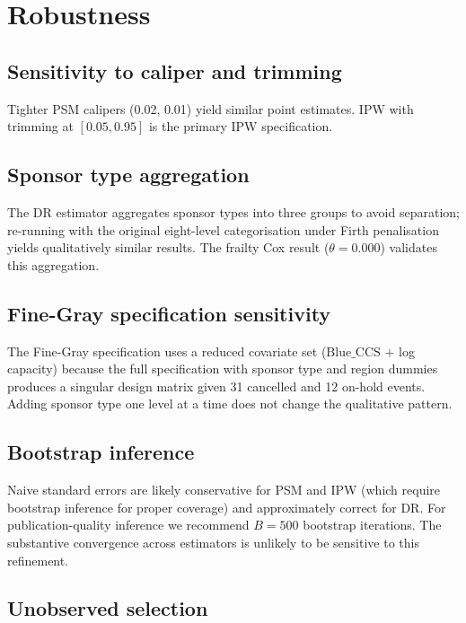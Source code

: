 \documentclass[review,authoryear,11pt]{elsarticle}
\newcommand{\BlueCCS}{\mathrm{Blue\_CCS}}
\begin{document}
\section{Robustness}

\subsection{Sensitivity to caliper and trimming}

Tighter PSM calipers (0.02, 0.01) yield similar point estimates. IPW with trimming at $[0.05, 0.95]$ is the primary IPW specification.

\subsection{Sponsor type aggregation}

The DR estimator aggregates sponsor types into three groups to avoid separation; re-running with the original eight-level categorisation under Firth penalisation yields qualitatively similar results. The frailty Cox result ($\theta = 0.000$) validates this aggregation.

\subsection{Fine-Gray specification sensitivity}

The Fine-Gray specification uses a reduced covariate set ($\BlueCCS$ $+$ log capacity) because the full specification with sponsor type and region dummies produces a singular design matrix given 31 cancelled and 12 on-hold events. Adding sponsor type one level at a time does not change the qualitative pattern.

\subsection{Bootstrap inference}

Naive standard errors are likely conservative for PSM and IPW (which require bootstrap inference for proper coverage) and approximately correct for DR. For publication-quality inference we recommend $B = 500$ bootstrap iterations. The substantive convergence across estimators is unlikely to be sensitive to this refinement.

\subsection{Unobserved selection}
\end{document}
